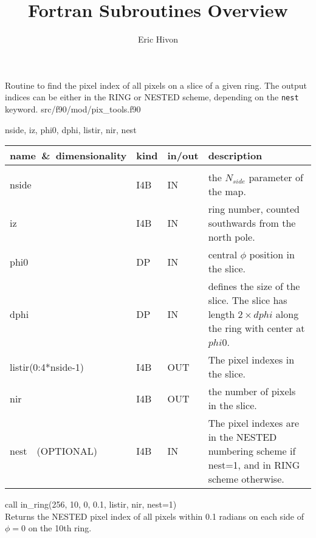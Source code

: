 
\sloppy


\title{\healpix Fortran Subroutines Overview}
 \section[in\_ring]{ }
\label{sub:in_ring}
\author{Eric Hivon}

\begin{facility}
{Routine to find the pixel index of all pixels on a slice of a given
ring. The output indices can be either in the RING or NESTED scheme,
depending on the {\tt nest} keyword.}
{src/f90/mod/pix\_tools.f90}
\end{facility}

\begin{f90format}
{nside, iz, phi0, dphi, listir, nir, nest}
\end{f90format}

\begin{arguments}
{
\begin{tabular}{p{0.4\hsize} p{0.05\hsize} p{0.1\hsize} p{0.35\hsize}} \hline  
\textbf{name~\&~dimensionality} & \textbf{kind} & \textbf{in/out} & \textbf{description} \\ \hline
                   &   &   &                           \\ %
nside & I4B & IN & the $N_{side}$ parameter of the map. \\
iz & I4B & IN & ring number, counted southwards from the north pole. \\
phi0 & DP & IN & central $\phi$ position in the slice. \\
dphi & DP & IN & defines the size of the slice. The slice has length $2\times dphi$ along the ring with center at $phi0$. \\ 
listir(0:4*nside-1) & I4B & OUT & The pixel indexes in the slice. \\
nir & I4B & OUT & the number of pixels in the slice. \\
nest\ \ (OPTIONAL) & I4B & IN &  The pixel indexes are in the NESTED numbering scheme if nest=1, and in RING scheme otherwise. \\
\end{tabular}
}
\end{arguments}

\begin{example}
{
call in\_ring(256, 10, 0, 0.1, listir, nir, nest=1)  \\
}
{
Returns the NESTED pixel index of all pixels within 0.1 radians on each side of $\phi=0$ on the 10th ring.
}
\end{example}

